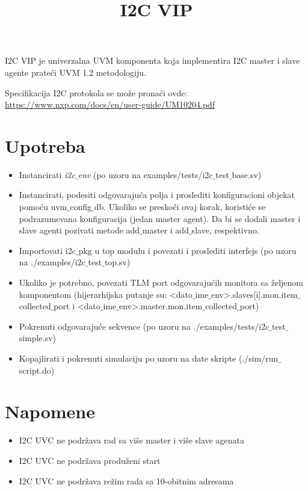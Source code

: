 \documentclass{article}
\title{
  \textmd{\textbf{I2C VIP}}
}
\author{}
\date{}
\begin{document}
\maketitle

I2C VIP je univerzalna UVM komponenta koja implementira I2C master i slave
agente prateći UVM 1.2 metodologiju.

Specifikacija I2C protokola se može pronaći ovde:
\url{https://www.nxp.com/docs/en/user-guide/UM10204.pdf}

\section{Upotreba}

\begin{itemize}
\item Instancirati \emph{i2c\(\_\)env} (po uzoru na
  examples/tests/i2c\(\_\)test\(\_\)base.sv)
\item Instancirati, podesiti odgovarajuća polja i proslediti konfiguracioni
  objekat pomoću uvm\(\_\)config\(\_\)db. Ukoliko se preskoči ovaj korak,
  koristiće se podrazumevana konfiguracija (jedan master agent). Da bi se dodali
  master i slave agenti pozivati metode add\(\_\)master i add\(\_\)slave,
  respektivno.
\item Importovati i2c\(\_\)pkg u top modulu i povezati i proslediti interfejs
  (po uzoru na ./examples/i2c\(\_\)test\(\_\)top.sv)
\item Ukoliko je potrebno, povezati TLM port odgovarajućih monitora sa željenom
  komponentom (hijerarhijska putanje su:
  <dato\(\_\)ime\(\_\)env>.slaves[i].mon.item\(\_\)collected\(\_\)port i
  <dato\(\_\)ime\(\_\)env>.master.mon.item\(\_\)collected\(\_\)port)
\item Pokrenuti odgovarajuće sekvence (po uzoru na
  ./examples/tests/i2c\(\_\)test\(\_\)simple.sv)
\item Kopajlirati i pokrenuti simulaciju po uzoru na date skripte (./sim/run\(\_\)script.do)
\end{itemize}

\section{Napomene}

\begin{itemize}
\item I2C UVC ne podržava rad sa više master i više slave agenata
\item I2C UVC ne podržava produženi start
\item I2C UVC ne podržava režim rada sa 10-obitnim adresama
\end{itemize}
\end{document}
